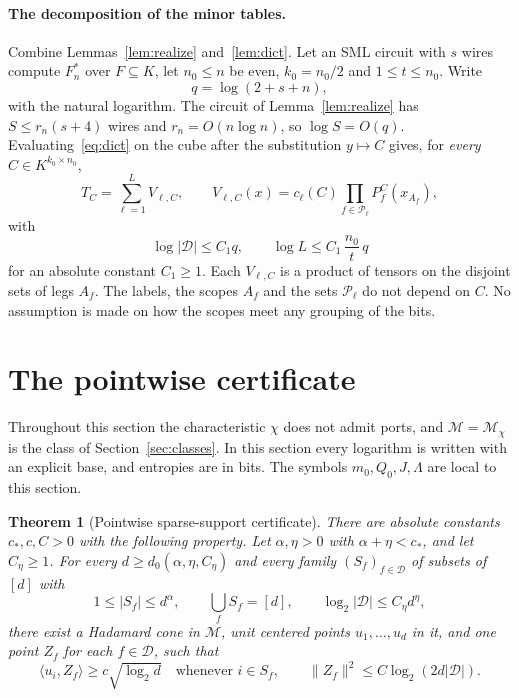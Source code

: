 \documentclass[11pt]{article}
\newtheorem{theorem}{Theorem}
\theoremstyle{remark}
\newcommand{\cM}{\mathcal M}
\newcommand{\cD}{\mathcal D}
\newcommand{\cP}{\mathcal P}
\newcommand{\ip}[2]{\langle #1,#2\rangle}
\newcommand{\norm}[1]{\lVert #1\rVert}
\begin{document}
\paragraph{The decomposition of the minor tables.}
Combine Lemmas~\ref{lem:realize} and~\ref{lem:dict}. Let an SML circuit
with \(s\) wires compute \(F^*_n\) over \(F\subseteq K\), let
\(n_0\le n\) be even, \(k_0=n_0/2\) and \(1\le t\le n_0\). Write
\[
 q=\log(2+s+n),
\]
with the natural logarithm. The circuit of Lemma~\ref{lem:realize} has
\(S\le r_n(s+4)\) wires and \(r_n=O(n\log n)\), so
\(\log S=O(q)\). Evaluating~\eqref{eq:dict} on the cube after the
substitution \(y\mapsto C\) gives, for \emph{every}
\(C\in K^{k_0\times n_0}\),
\begin{equation}\label{eq:decomp}
 T_C=\sum_{\ell=1}^LV_{\ell,C},\qquad
 V_{\ell,C}(x)=c_\ell(C)\prod_{f\in\cP_\ell}P_f^{C}(x_{A_f}),
\end{equation}
with
\begin{equation}\label{eq:counts}
 \log|\cD|\le C_1q,\qquad\log L\le C_1\,\frac{n_0}{t}\,q
\end{equation}
for an absolute constant \(C_1\ge1\). Each \(V_{\ell,C}\) is a product of
tensors on the disjoint sets of legs \(A_f\). The labels, the scopes
\(A_f\) and the sets \(\cP_\ell\) do not depend on \(C\). No assumption is
made on how the scopes meet any grouping of the bits.

\section{The pointwise certificate}\label{sec:geometry}
Throughout this section the characteristic \(\chi\) does not admit
ports, and \(\cM=\cM_\chi\) is the class of Section~\ref{sec:classes}.
In this section every logarithm is written with an explicit base, and
entropies are in bits. The symbols \(m_0,Q_0,J,\Lambda\) are local to this section.

\begin{theorem}[Pointwise sparse-support certificate]\label{thm:cert}
There are absolute constants \(c_*,c,C>0\) with the following property.
Let \(\alpha,\eta>0\) with \(\alpha+\eta<c_*\), and let \(C_\eta\ge1\).
For every \(d\ge d_0(\alpha,\eta,C_\eta)\) and every family
\((S_f)_{f\in\cD}\) of subsets of \([d]\) with
\[
 1\le|S_f|\le d^\alpha,\qquad\bigcup_fS_f=[d],\qquad
 \log_2|\cD|\le C_\eta d^\eta ,
\]
there exist a Hadamard cone in \(\cM\), unit centered points
\(u_1,\ldots,u_d\) in it, and one point \(Z_f\) for each \(f\in\cD\), such
that
\begin{equation}\label{eq:cert}
 \ip{u_i}{Z_f}\ge c\sqrt{\log_2d}\quad\text{whenever }i\in S_f,
 \qquad\norm{Z_f}^2\le C\log_2(2d|\cD|).
\end{equation}
\end{theorem}
\end{document}
